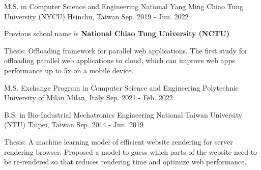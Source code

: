 

\begin{cventries}

  
\cventry
  {M.S. in Computer Science and Engineering} %
  {National Yang Ming Chiao Tung University (NYCU)} %
  {Hsinchu, Taiwan} %
  {Sep. 2019 - Jun. 2022} %
  {
    \begin{cvitems} %
      \item {Previous school name is \textbf{National Chiao Tung University (NCTU)}}
      \item {Thesis: Offloading framework for parallel web applications.
        The first study for offloading parallel web applications to cloud,
        which can improve web apps performance up to 5x on a mobile device.
      }
    \end{cvitems}
  }

  \vspace{-3mm}

\cventry
    {M.S. Exchange Program in Computer Science and Engineering} %
    {Polytechnic University of Milan} %
    {Milan, Italy} %
    {Sep. 2021 - Feb. 2022} %
    {}

  \vspace{-6mm}

  \cventry
    {B.S. in Bio-Industrial Mechatronics Engineering} %
    {National Taiwan University (NTU)} %
    {Taipei, Taiwan} %
    {Sep. 2014 - Jun. 2019} %
    {
      \begin{cvitems} %
        \item {Thesis: A machine learning model of efficient website rendering for server rendering browser.
          Proposed a model to guess which parts of the website need to be re-rendered so that reduces rendering time
          and optimize web performance.
        }
      \end{cvitems}
    }

\end{cventries}
